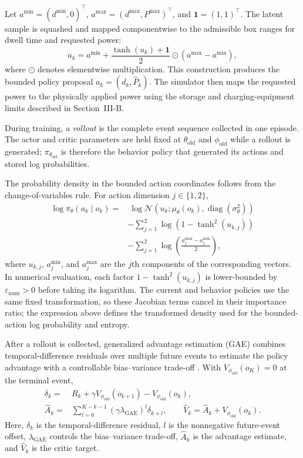\documentclass[conference]{IEEEtran}
\begin{document}
Let $a^{\min}=(d^{\min},0)^\top$, $a^{\max}=(d^{\max},P^{\max})^\top$, and $\mathbf{1}=(1,1)^\top$. The latent sample is squashed and mapped componentwise to the admissible box ranges for dwell time and requested power:
\begin{equation}
 a_k=a^{\min}+\frac{\tanh(u_k)+\mathbf{1}}{2}
 \odot(a^{\max}-a^{\min}),
\end{equation}
where $\odot$ denotes elementwise multiplication. This construction produces the bounded policy proposal $a_k=(d_k,\widehat{P}_k)$. The simulator then maps the requested power to the physically applied power using the storage and charging-equipment limits described in Section~III-B.

During training, a \emph{rollout} is the complete event sequence collected in one episode. The actor and critic parameters are held fixed at $\theta_{\mathrm{old}}$ and $\phi_{\mathrm{old}}$ while a rollout is generated; $\pi_{\theta_{\mathrm{old}}}$ is therefore the behavior policy that generated its actions and stored log probabilities.

The probability density in the bounded action coordinates follows from the change-of-variables rule. For action dimension $j\in\{1,2\}$,
\begin{align}
 \log\pi_\theta(a_k\mid o_k)
 =&\ \log\mathcal{N}\!\left(u_k;\mu_\theta(o_k),
 \operatorname{diag}(\sigma_\theta^2)\right) \nonumber\\
 &-\sum_{j=1}^{2}\log\!\left(1-\tanh^2(u_{k,j})\right) \nonumber\\
 &-\sum_{j=1}^{2}\log\!\left(\frac{a_j^{\max}-a_j^{\min}}{2}\right),
\end{align}
where $u_{k,j}$, $a_j^{\min}$, and $a_j^{\max}$ are the $j$th components of the corresponding vectors. In numerical evaluation, each factor $1-\tanh^2(u_{k,j})$ is lower-bounded by $\varepsilon_{\mathrm{num}}>0$ before taking its logarithm. The current and behavior policies use the same fixed transformation, so these Jacobian terms cancel in their importance ratio; the expression above defines the transformed density used for the bounded-action log probability and entropy.

After a rollout is collected, generalized advantage estimation (GAE) combines temporal-difference residuals over multiple future events to estimate the policy advantage with a controllable bias--variance trade-off \cite{schulman2015gae}. With $V_{\phi_{\mathrm{old}}}(o_K)=0$ at the terminal event,
\begin{align}
 \delta_k={}&R_k+\gamma V_{\phi_{\mathrm{old}}}(o_{k+1})
 -V_{\phi_{\mathrm{old}}}(o_k),\\
 \widehat{A}_k={}&\sum_{l=0}^{K-k-1}
 (\gamma\lambda_{\mathrm{GAE}})^l\delta_{k+l},\qquad
 \widehat{V}_k=\widehat{A}_k+V_{\phi_{\mathrm{old}}}(o_k).
\end{align}
Here, $\delta_k$ is the temporal-difference residual, $l$ is the nonnegative future-event offset, $\lambda_{\mathrm{GAE}}$ controls the bias--variance trade-off, $\widehat{A}_k$ is the advantage estimate, and $\widehat{V}_k$ is the critic target.
\end{document}
